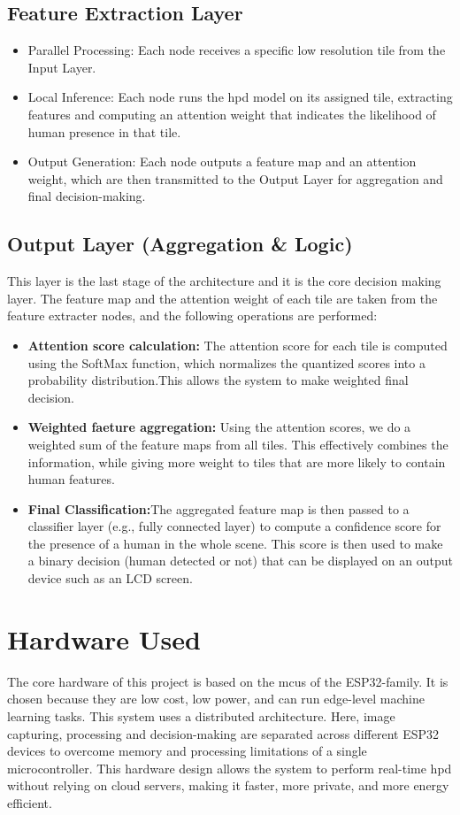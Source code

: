 \subsection{Feature Extraction Layer}
\begin{itemize}
    \item Parallel Processing: Each node receives a specific low resolution tile from the Input Layer.
    \item Local Inference: Each node runs the \gls{hpd} model on its assigned tile, extracting features and computing an attention weight that indicates the likelihood of human presence in that tile.
    \item Output Generation: Each node outputs a feature map and an attention weight, which are then transmitted to the Output Layer for aggregation and final decision-making.
\end{itemize}

\subsection{Output Layer (Aggregation \& Logic)}

This layer is the last stage of the architecture and it is the core decision making layer. The feature map and the attention weight of each tile are taken from the feature extracter nodes, and the following operations are performed:
 \begin{itemize}
     \item \textbf{Attention score calculation:} The attention score for each tile is computed using the SoftMax function, which normalizes the quantized scores into a probability distribution.This allows the system to  make weighted final decision.
     \item \textbf{Weighted faeture aggregation:} Using the attention scores, we do a weighted sum of the feature maps from all tiles. This effectively combines the information, while giving more weight to tiles that are more likely to contain human features.
     \item \textbf{Final Classification:}The aggregated feature map is then passed to a classifier layer (e.g., fully connected layer) to compute a confidence score for the presence of a human in the whole scene. This score is then used to make a binary decision (human detected or not) that can be displayed on an output device such as an LCD screen.
 \end{itemize}

\newpage
\section{Hardware Used}
The core hardware of this project is based on the \glspl{mcu} of the ESP32-family. It is chosen because they are low cost, low power, and can run edge-level machine learning tasks. This system uses a distributed architecture. Here, image capturing, processing and decision-making are separated across different ESP32 devices to overcome memory and processing limitations of a single microcontroller. This hardware design allows the system to perform real-time \gls{hpd} without relying on cloud servers, making it faster, more private, and more energy efficient.

